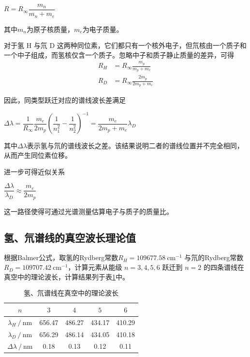 \documentclass[a4paper, 1.5lines]{ctexart}
\begin{document}
        \centerline{$R = R_{\infty}\dfrac{m_n}{m_n + m_e}$}

        其中$ m_n $为原子核质量，$m_e $为电子质量。

        对于氢 H 与氘 D 这两种同位素，它们都只有一个核外电子，但氘核由一个质子和一个中子组成，而氢核仅含一个质子。忽略中子和质子静止质量的差异，可得
        \begin{align*}
            R_H &= R_{\infty}\frac{m_p}{m_p + m_e}\\
            R_D &= R_{\infty}\frac{2m_p}{2m_p + m_e}
        \end{align*}

        因此，同类型跃迁对应的谱线波长差满足

        \centerline{$\Delta\lambda= \dfrac{1}{R_{\infty}}\dfrac{m_e}{2m_p}\left(\dfrac{1}{n_1^2}-\dfrac{1}{n_2^2}\right)^{-1}= \dfrac{m_e}{2m_p + m_e}\lambda_D$}

        其中$ \Delta\lambda $表示氢与氘的谱线波长之差。该结果说明二者的谱线位置并不完全相同，从而产生同位素位移。

        进一步可得近似关系

        \centerline{$\dfrac{\Delta\lambda}{\lambda_D} \approx \dfrac{m_e}{2m_p}$}

        这一路径使得可通过光谱测量估算电子与质子的质量比。

        \subsection{氢、氘谱线的真空波长理论值}
        根据Balmer公式，取氢的Rydberg常数$ R_H = 109677.58\ \mathrm{cm^{-1}}$ 与氘的Rydberg常数 $R_D = 109707.42\ \mathrm{cm^{-1}}$，计算元素从能级 $n=3,4,5,6$ 跃迁到 $n=2$ 的四条谱线在真空中的理论波长，计算结果列于表\ref{tab:theory_wavelength}中。

        \begin{table}[h]
            \centering
            \caption{氢、氘谱线在真空中的理论波长}
            \label{tab:hd-wavelengths}
            \begin{tabular}{@{} c c c c c @{}}
            \toprule
            $n$ & $3$ & $4$ & $5$ & $6$ \\
            \midrule
            $\lambda_{H}\ /\ \mathrm{nm}$ & 656.47 & 486.27 & 434.17 & 410.29 \\
            $\lambda_{D}\ /\ \mathrm{nm}$ & 656.29 & 486.14 & 434.05 & 410.18 \\
            $\Delta\lambda\ /\ \mathrm{nm}$ & 0.18 & 0.13 & 0.12 & 0.11 \\
            \bottomrule
            \end{tabular}
            \label{tab:theory_wavelength}
        \end{table}
\end{document}
